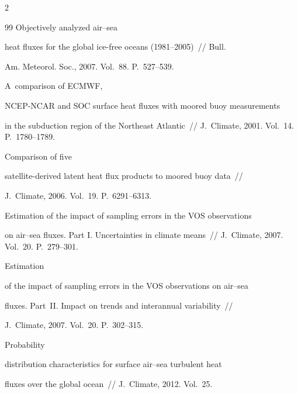 \begin{multicols}{2}
{{\begin{thebibliography}{99}
 Objectively analyzed air--sea


heat fluxes for the global ice-free oceans (1981--2005)~// Bull.


Am. Meteorol. Soc., 2007. Vol.~88. P.~527--539.







 A~comparison of ECMWF,


NCEP-NCAR and SOC surface heat fluxes with moored buoy measurements


in the subduction region of the Northeast Atlantic~// J.~Climate, 2001. Vol.~14. P.~1780--1789.







 Comparison of five


satellite-derived latent heat flux products to moored buoy data~//


J.~Climate, 2006. Vol.~19. P.~6291--6313.









Estimation of the impact of sampling errors in the VOS observations


on air--sea fluxes. Part I. Uncertainties in climate means~// J.~Climate, 2007. Vol.~20. P.~279--301.







 Estimation


of the impact of sampling errors in the VOS observations on air--sea


fluxes. Part~II. Impact on trends and interannual variability~//


J.~Climate, 2007. Vol.~20. P.~302--315.







 Probability


distribution characteristics for surface air--sea turbulent heat


fluxes over the global ocean~// J.~Climate, 2012. Vol.~25.



\end{thebibliography}}}
\end{multicols}
